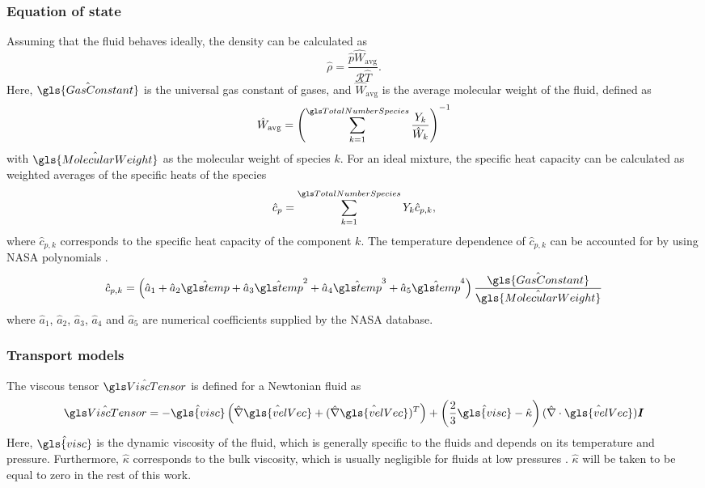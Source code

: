 \subsubsection{Equation of state}
Assuming that the fluid behaves ideally, the density can be calculated as
\begin{equation}
	\hat \rho = \frac{\hat{p}  \hat{W}_{\text{avg}}}{\mathcal{R} \hat{T} }. \label{eq:IdealGassDimensional}
\end{equation}
Here, $\hat{\gls{GasConstant}}$ is the universal gas constant of gases, and $\hat W_{\text{avg}}$ is the average molecular weight of the fluid, defined as
\begin{equation}
	\hat W_{\text{avg}} = \left( \SumOvAllns \frac{Y_k}{\hat W_k} \right)^{-1}
\end{equation}
with $\hat{\gls{MolecularWeight}}$ as the molecular weight of species $k$.  For an ideal mixture, the specific heat capacity can be calculated as weighted averages of the specific heats of the species 
\begin{equation}
	\hat c_p = \SumOvAllns Y_k \hat{c}_{p,k},%
\end{equation}
where $\hat{c}_{p,k}$ corresponds to the specific heat capacity of the component $k$. The temperature dependence of $\hat{c}_{p,k}$ can be accounted for by using NASA polynomials \parencite{mcbrideNASAThermodynamicData1993}.
\begin{equation}
	\hat{c}_{p,k} = \left(\hat a_1 + \hat  a_2\glsHat{temp} +\hat  a_3\glsHat{temp}^2 +\hat  a_4\glsHat{temp}^3+\hat a_5\glsHat{temp}^4\right)\frac{\hat{\gls{GasConstant}}}{\hat{\gls{MolecularWeight}}}
\end{equation}
where $\hat a_1$, $\hat a_2$, $\hat a_3$, $\hat a_4$ and $\hat a_5$ are numerical coefficients supplied by the NASA database.
\subsubsection{Transport models}
The viscous tensor $\glsHat{ViscTensor}$ is defined for a Newtonian fluid as
\begin{equation}
	\glsHat{ViscTensor}= -\hat{\gls{visc}}\left( \hat\nabla \hat{\gls{velVec}} +(\hat\nabla\hat{\gls{velVec}})^T\right)  + \left(\frac{2}{3}\hat{\gls{visc}} - \hat \kappa \right) (\hat\nabla\cdot \hat{\gls{velVec}})\mytensor{I}
\end{equation}
Here, $\hat{\gls{visc}}$ is the dynamic viscosity of the fluid, which is generally specific to the fluids and depends on its temperature and pressure. Furthermore, $\hat \kappa$ corresponds to the bulk viscosity, which is usually negligible for fluids at low pressures \parencite{birdTransportPhenomena1960}. $\hat \kappa$ will be taken to be equal to zero in the rest of this work.

